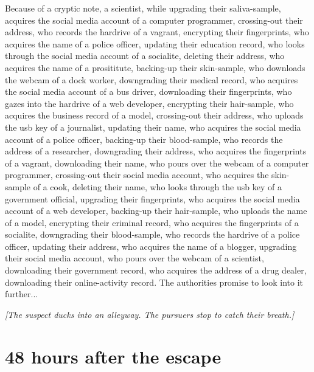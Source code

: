 \documentclass{report}
\begin{document}
Because of a cryptic note, a scientist, while upgrading their saliva-sample, acquires the social media account of a computer programmer, crossing-out their address, who records the hardrive of a vagrant, encrypting their fingerprints, who acquires the name of a police officer, updating their education record, who looks through the social media account of a socialite, deleting their address, who acquires the name of a prosititute, backing-up their skin-sample, who downloads the webcam of a dock worker, downgrading their medical record, who acquires the social media account of a bus driver, downloading their fingerprints, who gazes into the hardrive of a web developer, encrypting their hair-sample, who acquires the business record of a model, crossing-out their address, who uploads the usb key of a journalist, updating their name, who acquires the social media account of a police officer, backing-up their blood-sample, who records the address of a researcher, downgrading their address, who acquires the fingerprints of a vagrant, downloading their name, who pours over the webcam of a computer programmer, crossing-out their social media account, who acquires the skin-sample of a cook, deleting their name, who looks through the usb key of a government official, upgrading their fingerprints, who acquires the social media account of a web developer, backing-up their hair-sample, who uploads the name of a model, encrypting their criminal record, who acquires the fingerprints of a socialite, downgrading their blood-sample, who records the hardrive of a police officer, updating their address, who acquires the name of a blogger, upgrading their social media account, who pours over the webcam of a scientist, downloading their government record, who acquires the address of a drug dealer, downloading their online-activity record. The authorities promise to look into it further...

\textit{[The suspect ducks into an alleyway. The pursuers stop to catch their breath.]}


\section*{48 \small{hours after the escape}}
\end{document}
